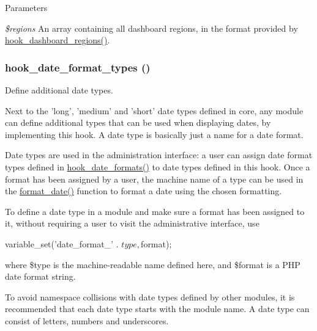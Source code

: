\begin{DoxyParams}{Parameters}
\item[{\em \$regions}]An array containing all dashboard regions, in the format provided by \hyperlink{group__hooks_ga533120daedea0c0bfd332400aab41ae2}{hook\_\-dashboard\_\-regions()}. \end{DoxyParams}
\hypertarget{group__hooks_gaadde7af71d0b4f827cf7aac1c88c4d23}{
\subsubsection[{hook\_\-date\_\-format\_\-types}]{\setlength{\rightskip}{0pt plus 5cm}hook\_\-date\_\-format\_\-types ()}}
\label{group__hooks_gaadde7af71d0b4f827cf7aac1c88c4d23}
Define additional date types.

Next to the 'long', 'medium' and 'short' date types defined in core, any module can define additional types that can be used when displaying dates, by implementing this hook. A date type is basically just a name for a date format.

Date types are used in the administration interface: a user can assign date format types defined in \hyperlink{group__hooks_ga2a190ba304193ab7752bfc489463a0d7}{hook\_\-date\_\-formats()} to date types defined in this hook. Once a format has been assigned by a user, the machine name of a type can be used in the \hyperlink{group__format_ga40553742a67f9c79c4669b9053fe202c}{format\_\-date()} function to format a date using the chosen formatting.

To define a date type in a module and make sure a format has been assigned to it, without requiring a user to visit the administrative interface, use 
\begin{DoxyCode}
 variable_set('date_format_' . $type, $format); 
\end{DoxyCode}
 where \$type is the machine-\/readable name defined here, and \$format is a PHP date format string.

To avoid namespace collisions with date types defined by other modules, it is recommended that each date type starts with the module name. A date type can consist of letters, numbers and underscores.

